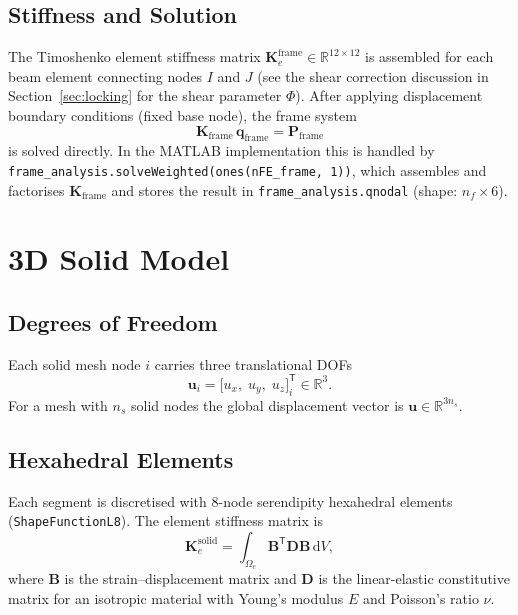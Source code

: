 \documentclass{article}
\begin{document}
\subsection{Stiffness and Solution}

The Timoshenko element stiffness matrix $\bm{K}_e^{\text{frame}} \in \mathbb{R}^{12\times12}$
is assembled for each beam element connecting nodes $I$ and $J$ (see the shear
correction discussion in Section~\ref{sec:locking} for the shear parameter
$\Phi$).  After applying displacement boundary conditions (fixed base node), the frame system
\begin{equation}
    \bm{K}_{\text{frame}}\,\bm{q}_{\text{frame}} = \bm{P}_{\text{frame}}
\end{equation}
is solved directly.  In the MATLAB implementation this is handled by
\lstinline{frame_analysis.solveWeighted(ones(nFE_frame, 1))}, which assembles
and factorises $\bm{K}_{\text{frame}}$ and stores the result in
\lstinline{frame_analysis.qnodal} (shape: $n_f \times 6$).

\section{3D Solid Model}
\label{sec:solid}

\subsection{Degrees of Freedom}

Each solid mesh node $i$ carries three translational DOFs
\begin{equation}
    \bm{u}_i = \bigl[u_x,\; u_y,\; u_z\bigr]_i^{\mathsf{T}} \in \mathbb{R}^3.
\end{equation}
For a mesh with $n_s$ solid nodes the global displacement vector is
$\bm{u} \in \mathbb{R}^{3 n_s}$.

\subsection{Hexahedral Elements}

Each segment is discretised with 8-node serendipity hexahedral elements
(\texttt{ShapeFunctionL8}).  The element stiffness matrix is
\begin{equation}
    \bm{K}_e^{\text{solid}} = \int_{\Omega_e} \bm{B}^{\mathsf{T}} \bm{D} \bm{B}\,\mathrm{d}V,
\end{equation}
where $\bm{B}$ is the strain--displacement matrix and $\bm{D}$ is the
linear-elastic constitutive matrix for an isotropic material with Young's
modulus $E$ and Poisson's ratio $\nu$.
\end{document}
